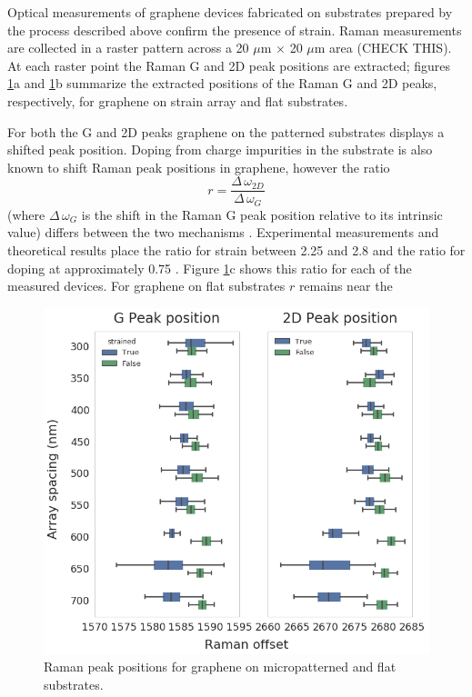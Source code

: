 \documentclass[%
 aip,
 apl,%
 amsmath,amssymb,
 reprint,%
]{revtex4-1}
\begin{document}

Optical measurements of graphene devices fabricated on substrates prepared by the process described above
confirm the presence of strain. Raman measurements are collected in a raster pattern across a 
20 $\mu$m  $\times$ 20 $\mu$m area (CHECK THIS). At each raster point the Raman G and 2D peak positions
are extracted; figures \ref{'fig:raman'}a and \ref{'fig:raman'}b summarize the extracted positions 
of the Raman G and 2D peaks, respectively, 
for graphene on strain array and flat substrates. 

For both the G and 2D peaks graphene on the patterned 
substrates displays a shifted peak position. Doping from charge impurities in the substrate is also known to 
shift Raman peak positions in graphene\cite{reina2008large, casiraghi2007raman}, however the ratio 
\begin{equation}
    r = \frac{\Delta \, \omega_{2D}}{\Delta \, \omega_{G}}
\end{equation}
(where $\Delta \, \omega_{G}$ is the shift in the Raman G peak position relative to its intrinsic value)
differs between the two mechanisms \cite{lee2012optical}. 
Experimental measurements \cite{zabel2012raman, metzger2009biaxial, ding2010stretchable} and theoretical \cite{mohr2010splitting, mohiuddin2009uniaxial} results place the ratio for strain between 2.25 and 2.8 and the ratio for doping at approximately 0.75 \cite{lee2012optical}. Figure \ref{'fig:raman'}c shows this ratio for each 
of the measured devices. For graphene on flat substrates $r$ remains near the 

\begin{figure}
\centering
\includegraphics[width=\columnwidth]{Figure3}
\caption{Raman peak positions for graphene on micropatterned and flat substrates.}
\label{'fig:raman'}
\end{figure}
\end{document}
